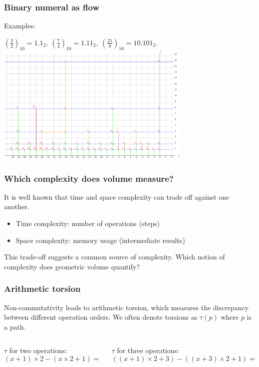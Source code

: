 \documentclass[aspectratio=169]{beamer}
\begin{document}
\begin{frame}
    \frametitle{Binary numeral as flow}
            Examples:
    \begin{center}
         $\left(\frac{3}{2}\right)_{10} = 1.1_{2},\ \left(\frac{7}{4}\right)_{10} = 1.11_{2},\ \left(\frac{21}{8}\right)_{10} = 10.101_{2}.$
        \includegraphics[width=0.7\textwidth]{../images/multiplication}
    \end{center}
\end{frame}

\begin{frame}
    \frametitle{Which complexity does volume measure?}
    It is well known that time and space complexity can trade off against one another.
    \begin{itemize}
        \item Time complexity: number of operations (steps)
        \item Space complexity: memory usage (intermediate results)
    \end{itemize}
    This trade-off suggests a common source of complexity. Which notion of complexity does geometric volume quantify?
\end{frame}

\begin{frame}
    \frametitle{Arithmetic torsion}
    Non-commutativity leads to arithmetic torsion, which measures the discrepancy between different operation orders.
    We often denote torsions as \(\tau(p)\) where $p$ is a path.
    \newline\newline
    \begin{columns}
        \begin{column}{0.5\textwidth}
            $\tau$ for two operations:
            $$(x + 1) \times 2 - (x \times 2 + 1) = 1$$
        \end{column}
        \begin{column}{0.5\textwidth}
            $\tau$ for three operations:
            $$((x + 1) \times 2 + 3) - ((x + 3) \times 2 + 1) = 1$$
        \end{column}
    \end{columns}
\end{frame}
\end{document}
